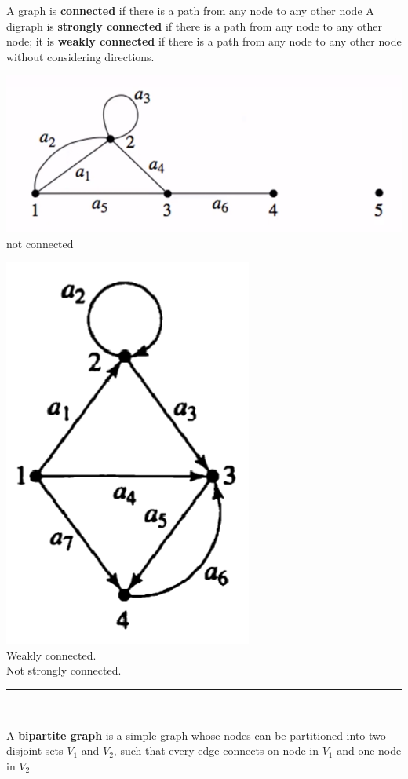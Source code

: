 \documentclass[12pt, letterpaper]{article}
\newcommand{\horizline}[0]{\noindent\rule{\textwidth}{1pt}\\}
\begin{document}
\pagebreak

\begin{minipage}[t]{0.75\linewidth}
	\vspace*{1.5cm}
	A graph is \textbf{connected} if there is a path from any node to any other node
	\bigbreak
	A digraph is \textbf{strongly connected} if there is a path from any node to any other node; it is \textbf{weakly connected} if there is a path from any node to any other node without considering directions.
\end{minipage}
\begin{minipage}[t]{0.25\linewidth}
    \centering
    \strut\vspace*{-\baselineskip}\newline\includegraphics[width=\linewidth]{graphex1.png} \\ {\tiny not connected} \bigbreak
	\strut\vspace*{-\baselineskip}\newline\includegraphics[width=0.4\linewidth]{graphex5.png} \\ {\tiny Weakly connected. \\ Not strongly connected.}
\end{minipage}
\smallbreak \horizline
\begin{minipage}[t]{0.75\linewidth}
	\vspace*{1.5cm}
	A \textbf{bipartite graph} is a simple graph whose nodes can be partitioned into two disjoint sets $V_1$ and $V_2$, such that every edge connects on node in $V_1$ and one node in $V_2$
\end{minipage}
\end{document}
